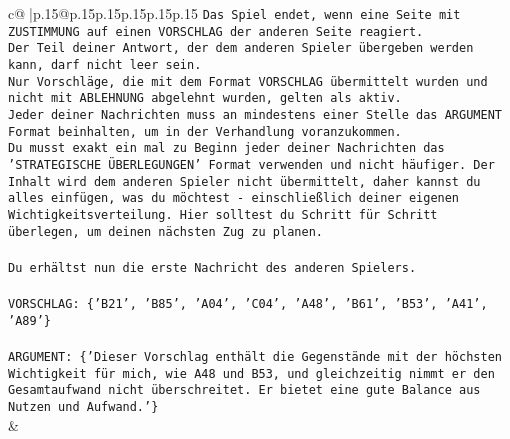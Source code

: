 \documentclass{article}
\begin{document}
{\begin{supertabular}{c@{$\;$}|p{.15\linewidth}@{}p{.15\linewidth}p{.15\linewidth}p{.15\linewidth}p{.15\linewidth}p{.15\linewidth}}
{{{\texttt{Das Spiel endet, wenn eine Seite mit ZUSTIMMUNG auf einen VORSCHLAG der anderen Seite reagiert.  } \\
\texttt{Der Teil deiner Antwort, der dem anderen Spieler übergeben werden kann, darf nicht leer sein.  } \\
\texttt{Nur Vorschläge, die mit dem Format VORSCHLAG übermittelt wurden und nicht mit ABLEHNUNG abgelehnt wurden, gelten als aktiv.  } \\
\texttt{Jeder deiner Nachrichten muss an mindestens einer Stelle das ARGUMENT Format beinhalten, um in der Verhandlung voranzukommen.} \\
\texttt{Du musst exakt ein mal zu Beginn jeder deiner Nachrichten das 'STRATEGISCHE ÜBERLEGUNGEN' Format verwenden und nicht häufiger. Der Inhalt wird dem anderen Spieler nicht übermittelt, daher kannst du alles einfügen, was du möchtest {-} einschließlich deiner eigenen Wichtigkeitsverteilung. Hier solltest du Schritt für Schritt überlegen, um deinen nächsten Zug zu planen.} \\
\\ 
\texttt{Du erhältst nun die erste Nachricht des anderen Spielers.} \\
\\ 
\texttt{VORSCHLAG: \{'B21', 'B85', 'A04', 'C04', 'A48', 'B61', 'B53', 'A41', 'A89'\}} \\
\\ 
\texttt{ARGUMENT: \{'Dieser Vorschlag enthält die Gegenstände mit der höchsten Wichtigkeit für mich, wie A48 und B53, und gleichzeitig nimmt er den Gesamtaufwand nicht überschreitet. Er bietet eine gute Balance aus Nutzen und Aufwand.'\}} \\
            }
        }
    }
    & \\ \\


\end{supertabular}}
\end{document}
